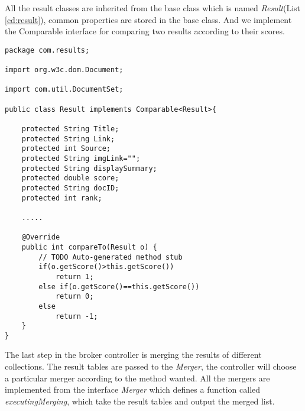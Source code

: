 All the result classes are inherited from the base class which is named \textit{Result}(List \ref{cd:result}), common properties are stored in the base class. And we implement the Comparable interface for comparing two results according to their scores.
\begin{lstlisting}[caption={Code of class Result} label=cd:result]
package com.results;

import org.w3c.dom.Document;

import com.util.DocumentSet;

public class Result implements Comparable<Result>{

	protected String Title;
	protected String Link;
	protected int Source;
	protected String imgLink="";
	protected String displaySummary;
	protected double score;
	protected String docID;
	protected int rank;

	.....
	
	@Override
	public int compareTo(Result o) {
		// TODO Auto-generated method stub
		if(o.getScore()>this.getScore())
			return 1;
		else if(o.getScore()==this.getScore())
			return 0;
		else
			return -1;
	}
}
\end{lstlisting}

The last step in the broker controller is merging the results of different collections. The result tables are passed to the \textit{Merger}, the controller will choose a particular merger according to the method wanted. All the mergers are implemented from the interface \textit{Merger} which defines a function called \textit{executingMerging}, which take the result tables and output the merged list.